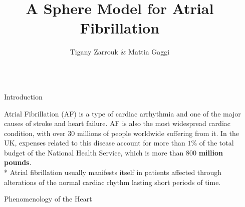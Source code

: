 \documentclass[final,hyperref={pdfpagelabels=false}]{beamer}
\title{\huge A Sphere Model for Atrial Fibrillation} %
\author{Tigany Zarrouk \& Mattia Gaggi } %
\institute{Supervisor: Kim Christensen.  Condensed Matter Theory Group---Imperial College London} %
\begin{document}

\begin{frame}[t] %

\begin{columns}[t] %

\begin{column}{.02\textwidth}\end{column} %

\begin{column}{.465\textwidth} %




            
\begin{block}{Introduction}


Atrial Fibrillation (AF) is a type of cardiac arrhythmia and one of the major causes of stroke and heart failure. AF is also the most widespread cardiac condition, with over 30 millions of people worldwide suffering from it. In the UK, expenses related to this disease account for more than $1\%$ of the total budget of the National Health Service, which is more than $800$ \textbf{million pounds}.\\*
 Atrial fibrillation usually manifests itself in patients affected through alterations of the normal cardiac rhythm lasting short periods of time.\\



\end{block}


\begin{block}{Phenomenology of the Heart}


\end{block}
\end{column}
\end{columns}
\end{frame}
\end{document}
